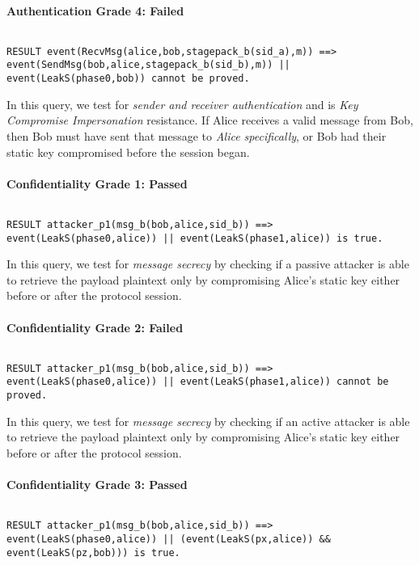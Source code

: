 \paragraph{Authentication Grade 4: Failed}$ $
\begin{lstlisting}
RESULT event(RecvMsg(alice,bob,stagepack_b(sid_a),m)) ==> event(SendMsg(bob,alice,stagepack_b(sid_b),m)) || event(LeakS(phase0,bob)) cannot be proved.
\end{lstlisting}

In this query, we test for \emph{sender and receiver authentication} and is \emph{Key Compromise Impersonation} resistance. If Alice receives a valid message from Bob, then Bob must have sent that message to \emph{Alice specifically}, or Bob had their static key compromised before the session began.


\paragraph{Confidentiality Grade 1: Passed}$ $
\begin{lstlisting}
RESULT attacker_p1(msg_b(bob,alice,sid_b)) ==> event(LeakS(phase0,alice)) || event(LeakS(phase1,alice)) is true.
\end{lstlisting}

In this query, we test for \emph{message secrecy} by checking if a passive attacker is able to retrieve the payload plaintext only by compromising Alice's static key either before or after the protocol session.


\paragraph{Confidentiality Grade 2: Failed}$ $
\begin{lstlisting}
RESULT attacker_p1(msg_b(bob,alice,sid_b)) ==> event(LeakS(phase0,alice)) || event(LeakS(phase1,alice)) cannot be proved.
\end{lstlisting}

In this query, we test for \emph{message secrecy} by checking if an active attacker is able to retrieve the payload plaintext only by compromising Alice's static key either before or after the protocol session.


\paragraph{Confidentiality Grade 3: Passed}$ $
\begin{lstlisting}
RESULT attacker_p1(msg_b(bob,alice,sid_b)) ==> event(LeakS(phase0,alice)) || (event(LeakS(px,alice)) && event(LeakS(pz,bob))) is true.
\end{lstlisting}

